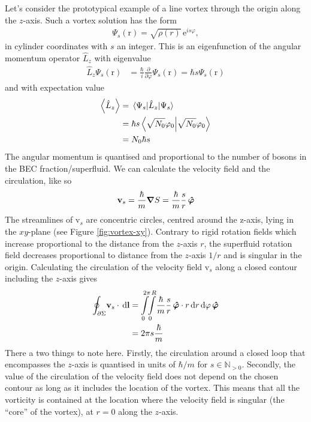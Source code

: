 \documentclass[12pt,a4paper]{book}
\renewcommand{\vec}[1]{\bm{\mathrm{#1}}}
\newcommand{\unit}[1]{\,\mathrm{#1}}
\begin{document}
			Let's consider the prototypical example of a line vortex through the origin along the $z$-axis. Such a vortex solution has the form
			\begin{align}
				\Psi_s(\vec{r}) = \sqrt{\rho(r)}\unit{e}^{is\varphi},
			\end{align}
			in cylinder coordinates with $s$ an integer. This is an eigenfunction of the angular momentum operator $\hat{L}_z$ with eigenvalue
			\begin{align}
				\hat{L}_z \Psi_s(\vec{r}) &= \frac{\hbar}{i}\frac{\partial}{\partial\varphi}\Psi_s(\vec{r}) = \hbar s\Psi_s(\vec{r})
			\end{align}
			and with expectation value
			\begin{align}
				\expval{\hat{L}_z} &= \expval{\hat{L}_z}{\Psi_s} \\
					&= \hbar s \braket{\sqrt{N_0}\varphi_0} \\
					&= N_0\hbar s
			\end{align}
			The angular momentum is quantised and proportional to the number of bosons in the BEC fraction/superfluid. We can calculate the velocity field and the circulation, like so
			\begin{align}
				\vec{v}_s = \frac{\hbar}{m}\grad{S} = \frac{\hbar}{m}\frac{s}{r}\,\vu*{\varphi}
			\end{align}
			The streamlines of $\vec{v}_s$ are concentric circles, centred around the z-axis, lying in the $xy$-plane (see Figure \ref{fig:vortex-xy}). Contrary to rigid rotation fields which increase proportional to the distance from the $z$-axis $r$, the superfluid rotation field decreases proportional to distance from the $z$-axis $1/r$ and is singular in the origin. Calculating the circulation of the velocity field $\vec{v}_s$ along a closed contour including the $z$-axis gives
			\begin{align}
				\oint_{\partial\Sigma}\!\vec{v}_s\cdot\unit{d}\vec{l} &=
				\int\displaylimits_{0}^{2\pi}\!\!\int\displaylimits_{0}^{R}\!\frac{\hbar}{m}\frac{s}{r}\,\vu*{\varphi}\cdot r\unit{d}r\unit{d}\varphi\,\vu*{\varphi} \\
					&= 2\pi s\frac{\hbar}{m}
			\end{align}
			There a two things to note here. Firstly, the circulation around a closed loop that encompasses the $z$-axis is quantised in units of $\hbar/m$ for $s\in\mathbb{N}_{>0}$. Secondly, the value of the circulation of the velocity field does not depend on the chosen contour as long as it includes the location of the vortex. This means that all the vorticity is contained at the location where the velocity field is singular (the ``core'' of the vortex), at $r=0$ along the $z$-axis.\\
			
\end{document}
